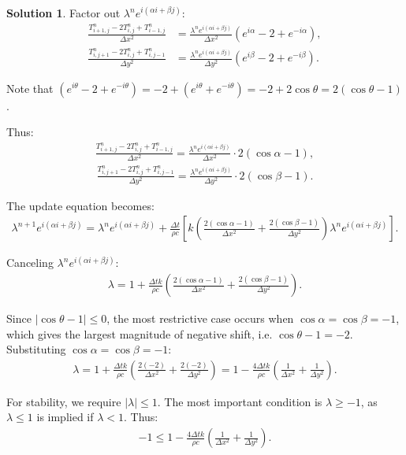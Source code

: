 \documentclass[12pt]{article}
\theoremstyle{definition} %
\newtheorem{solution}{Solution}
\theoremstyle{plain} %
\begin{document}
\begin{solution}
 Factor out $\lambda^n e^{i(\alpha i + \beta j)}$:
\begin{align}
\frac{T_{i+1,j}^n - 2T_{i,j}^n + T_{i-1,j}^n}{\Delta x^2} &= \frac{\lambda^n e^{i(\alpha i + \beta j)}}{\Delta x^2} (e^{i\alpha} - 2 + e^{-i\alpha}), \\
\frac{T_{i,j+1}^n - 2T_{i,j}^n + T_{i,j-1}^n}{\Delta y^2} &= \frac{\lambda^n e^{i(\alpha i + \beta j)}}{\Delta y^2} (e^{i\beta} - 2 + e^{-i\beta}).
\end{align}

 Note that $(e^{i\theta} - 2 + e^{-i\theta}) = -2 + (e^{i\theta} + e^{-i\theta}) = -2 + 2\cos\theta = 2(\cos\theta - 1)$.

 Thus:
\begin{align}
\frac{T_{i+1,j}^n - 2T_{i,j}^n + T_{i-1,j}^n}{\Delta x^2} = \frac{\lambda^n e^{i(\alpha i + \beta j)}}{\Delta x^2} \cdot 2(\cos\alpha - 1),
\end{align}
\begin{align}
\frac{T_{i,j+1}^n - 2T_{i,j}^n + T_{i,j-1}^n}{\Delta y^2} = \frac{\lambda^n e^{i(\alpha i + \beta j)}}{\Delta y^2} \cdot 2(\cos\beta - 1).
\end{align}

 The update equation becomes:
\begin{align}
\lambda^{n+1} e^{i(\alpha i + \beta j)} = \lambda^n e^{i(\alpha i + \beta j)} + \frac{\Delta t}{\rho c} \left[ k \left( \frac{2(\cos\alpha - 1)}{\Delta x^2} + \frac{2(\cos\beta - 1)}{\Delta y^2} \right)\lambda^n e^{i(\alpha i + \beta j)} \right].
\end{align}

 Canceling $\lambda^n e^{i(\alpha i + \beta j)}$:
\begin{align}
\lambda = 1 + \frac{\Delta t k}{\rho c}\left( \frac{2(\cos\alpha - 1)}{\Delta x^2} + \frac{2(\cos\beta - 1)}{\Delta y^2}\right).
\end{align}

 Since $|\cos\theta - 1| \leq 0$, the most restrictive case occurs when $\cos\alpha = \cos\beta = -1$, which gives the largest magnitude of negative shift, i.e. $\cos\theta - 1 = -2$. Substituting $\cos\alpha = \cos\beta = -1$:
\begin{align}
\lambda = 1 + \frac{\Delta t k}{\rho c}\left(\frac{2(-2)}{\Delta x^2} + \frac{2(-2)}{\Delta y^2}\right) = 1 - \frac{4\Delta t k}{\rho c}\left( \frac{1}{\Delta x^2} + \frac{1}{\Delta y^2}\right).
\end{align}

 For stability, we require $|\lambda| \leq 1$. The most important condition is $\lambda \geq -1$, as $\lambda \leq 1$ is implied if $\lambda < 1$. Thus:
\begin{align}
-1 \leq 1 - \frac{4\Delta t k}{\rho c}\left( \frac{1}{\Delta x^2} + \frac{1}{\Delta y^2} \right).
\end{align}


\end{solution}
\end{document}

